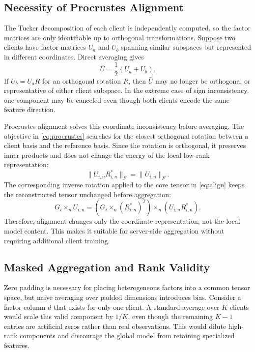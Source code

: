\documentclass[conference]{IEEEtran}
\begin{document}
\subsection{Necessity of Procrustes Alignment}
The Tucker decomposition of each client is independently computed, so the factor matrices are only identifiable up to orthogonal transformations. Suppose two clients have factor matrices $U_a$ and $U_b$ spanning similar subspaces but represented in different coordinates. Direct averaging gives
\begin{equation}
    \bar{U}=\frac{1}{2}(U_a+U_b).
\end{equation}
If $U_b=U_aR$ for an orthogonal rotation $R$, then $\bar{U}$ may no longer be orthogonal or representative of either client subspace. In the extreme case of sign inconsistency, one component may be canceled even though both clients encode the same feature direction.

Procrustes alignment solves this coordinate inconsistency before averaging. The objective in \eqref{eq:procrustes} searches for the closest orthogonal rotation between a client basis and the reference basis. Since the rotation is orthogonal, it preserves inner products and does not change the energy of the local low-rank representation:
\begin{equation}
    \|U_{i,n}R_{i,n}^{*}\|_F=\|U_{i,n}\|_F.
\end{equation}
The corresponding inverse rotation applied to the core tensor in \eqref{eq:align} keeps the reconstructed tensor unchanged before aggregation:
\begin{equation}
    G_i\times_n U_{i,n}=\left(G_i\times_n (R_{i,n}^{*})^T\right)\times_n\left(U_{i,n}R_{i,n}^{*}\right).
\end{equation}
Therefore, alignment changes only the coordinate representation, not the local model content. This makes it suitable for server-side aggregation without requiring additional client training.

\subsection{Masked Aggregation and Rank Validity}
Zero padding is necessary for placing heterogeneous factors into a common tensor space, but naive averaging over padded dimensions introduces bias. Consider a factor column $d$ that exists for only one client. A standard average over $K$ clients would scale this valid component by $1/K$, even though the remaining $K-1$ entries are artificial zeros rather than real observations. This would dilute high-rank components and discourage the global model from retaining specialized features.
\end{document}
